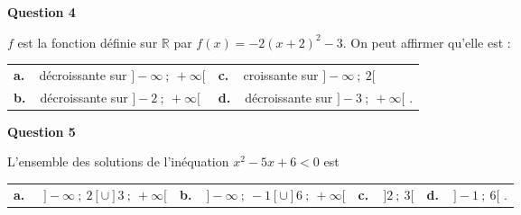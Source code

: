 \documentclass[10pt]{article}
\providecommand{\R}{\mathbb{R}}
\begin{document}
\medskip

\textbf{Question 4}

\medskip 

$f$ est la fonction définie sur $\R$ par $f(x) = -2(x + 2)^2 - 3$. On peut affirmer qu’elle est :

\medskip

\begin{tabularx}{\linewidth}{*{2}{X}}
\textbf{a.~~}décroissante sur $]-\infty~;~+\infty[$&\textbf{c.~~}croissante sur $]-\infty~;~2[$\\
\textbf{b.~~}décroissante sur $]-2~;~+\infty[$&\textbf{d.~~}décroissante sur $]-3~;~+\infty[$ .\\
\end{tabularx}

\medskip

\textbf{Question  5}

\medskip 

L’ensemble des solutions de l’inéquation $x^2 -5x + 6 < 0 $ est

\medskip

\begin{tabularx}{\linewidth}{*{4}{X}}
\textbf{a.~~} $ ]-\infty~;~2[ \cup ]3~;~+\infty[$ &\textbf{b.~~}$]-\infty~;~-1[ \cup ]6~;~+\infty[ $ &\textbf{c.~~}$]2~;~3[$& \textbf{d.~~}$ ]-1~;~6[$ .
\end{tabularx}

\vspace{0,5cm}
\end{document}
